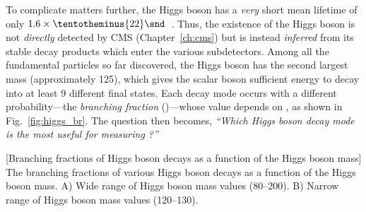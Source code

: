 To complicate matters further, the Higgs boson has a \emph{very} short mean lifetime of only $1.6 \times \tentotheminus{22}\snd$~\cite{particle_data_group_review_2020}. %
Thus, the existence of the Higgs boson is not \emph{directly} detected by CMS (Chapter~\ref{ch:cms}) but is instead \emph{inferred} from its stable decay products which enter the various subdetectors.
Among all the fundamental particles so far discovered, the Higgs boson has the second largest mass (approximately 125\GeV),
which gives the scalar boson sufficient energy to decay into at least 9 different final states.
Each decay mode occurs with a different probability---the \emph{branching fraction} (\br)---whose value depends on \mH, as shown in Fig.~\ref{fig:higgs_br}.
The question then becomes, \emph{``Which Higgs boson decay mode is the most useful for measuring \mH?''}
\begin{multiFigure}
	\centering
		[Branching fractions of Higgs boson decays as a function of the Higgs boson mass]
		{The branching fractions of various Higgs boson decays as a function of the Higgs boson mass.
		\;A) Wide range of Higgs boson mass values (80--200\GeV).
		\;B) Narrow range of Higgs boson mass values (120--130\GeV).
	}
	\label{fig:higgs_br}
\end{multiFigure} 

